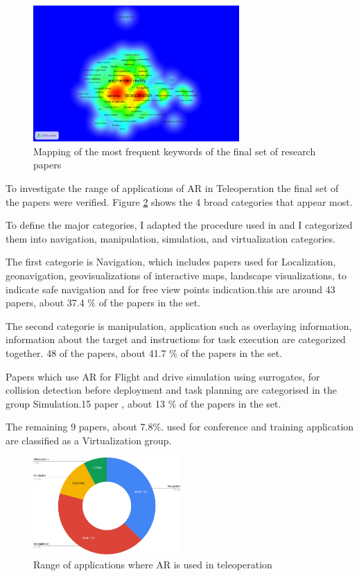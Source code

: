 \begin{figure}[h]
    \centering
    \includegraphics[width=0.7\textwidth]{images/Density_3.png}
    \caption{Mapping of the most frequent keywords of the final set of research papers}
    \label{fig:final Density}
\end{figure}

To investigate the range of applications of AR in Teleoperation the final set of the papers were verified. Figure \ref{fig:range of applications} shows the 4 broad categories that appear most.
 
To define the  major categories, I adapted the procedure used in \cite{7912316} and I categorized them into navigation, manipulation, simulation, and virtualization categories.
 
The first categorie is Navigation, which includes papers used for Localization, geonavigation, geovisualizations of interactive maps, landscape visualizations, to indicate safe navigation and for free view points indication.this are around 43 papers, about 37.4 $\%$ of the papers in the set.
 
The second categorie is manipulation, application such as overlaying information, information about the target and instructions for task execution are categorized together. 48 of the papers, about 41.7 $\%$ of the papers in the set.
 
Papers which use AR for Flight and drive simulation using surrogates, for collision detection before deployment and task planning are categorised in the group Simulation.15 paper , about 13 $\%$ of the papers in the set.
 
The remaining 9 papers, about 7.8$\%$. used for conference and training application are classified as a Virtualization group.
 
 
\begin{figure}[h]
    \centering
    \includegraphics[width=0.5\textwidth]{images/chart.png}
    \caption{Range of applications where AR is used in teleoperation}
    \label{fig:range of applications}
\end{figure}

